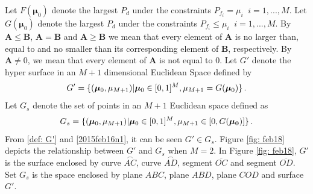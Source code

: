 Let $F(\boldsymbol{\mu}_0)$ denote the largest $P_d$ under the constraints $P_{f_i} = \mu_i\;\;i = 1, ..., M$.
Let $G(\boldsymbol{\mu}_0)$ denote the largest $P_d$ under the constraints $P_{f_i} \leq \mu_i\;\;i = 1, ..., M$.
By $\mathbf{A} \leq \mathbf{B}$, $\mathbf{A} = \mathbf{B}$ and  $\mathbf{A} \geq \mathbf{B}$ we mean that every element of $\mathbf{A}$ is no larger than, equal to and no smaller than its corresponding element of $\mathbf{B}$, respectively. 
By $\mathbf{A} \neq 0$, we mean that every element of $\mathbf{A}$ is not equal to $0$. 
Let $G'$ denote the hyper surface in an $M+1$ dimensional Euclidean Space defined by 
\begin{equation}
 \label{def: G'}
 G' = \{(\boldsymbol{\mu}_0, \mu_{M+1})  | \boldsymbol{\mu}_0 \in [0, 1]^M, \mu_{M+1}= G(\boldsymbol{\mu}_0) \}\,.
\end{equation}
Let $G_s$ denote the set of points in an $M+1$ Euclidean space defined as 
\begin{equation}
  \label{2015feb16n1}
G_s =  \{(\boldsymbol{\mu}_0, \mu_{M+1}) | \boldsymbol{\mu}_0\in [0, 1]^M, \mu_{M+1} \in [0, G(\mathbf{\boldsymbol{\mu}_0})]
    \}\,.
  \end{equation}
  From \eqref{def: G'} and \eqref{2015feb16n1}, it can be seen $G' \in G_s$. Figure \ref{fig: feb18} depicts the relationship between $G'$ and $G_s$ when $M=2$. In Figure \ref{fig: feb18}, $G'$ is the surface enclosed by curve $\stackrel\frown{AC}$, curve $\stackrel\frown{AD}$, segment $\overline{OC}$ and segment $\overline{OD}$. Set $G_s$ is the space enclosed by plane $ABC$, plane $ABD$, plane $COD$ and surface $G'$.  

